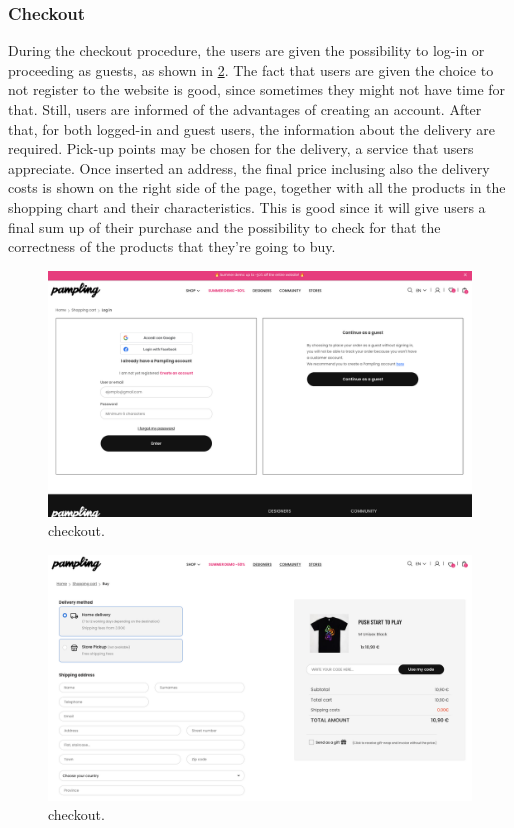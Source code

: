 \subsubsection{Checkout}
During the checkout procedure, the users are given the possibility to log-in or proceeding as
guests, as shown in \cref{fig:checkout-2}. The fact that users are given the choice to not register
to the website is good, since sometimes they might not have time for that. Still, users are informed 
of the advantages of creating an account. 
After that, for both logged-in and guest users, the information about the delivery are required.
Pick-up points may be chosen for the delivery, a service that users appreciate.
Once inserted an address, the final price inclusing also the delivery costs is shown on the right side
of the page, together with all the products in the shopping chart and their characteristics.
This is good since it will give users a final sum up of their purchase and the possibility to check for that the 
correctness of the products that they're going to buy. 

\begin{figure}[H]
	\centering
	\includegraphics[scale=0.225]{images/checkout2.png}
	\caption{checkout.}
	\label{fig:checkout-2}
\end{figure}
\begin{figure}[H]
	\centering
	\includegraphics[scale=0.225]{images/checkout3.png}
	\caption{checkout.}
	\label{fig:checkout-2}
\end{figure}

